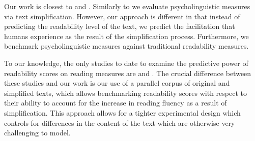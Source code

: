 Our work is closest to \citet{howcroft-demberg2017} and \citet{nahatame2021text}. Similarly to \citet{howcroft-demberg2017} we evaluate  psycholinguistic measures via text simplification. However, our approach is different in that instead of predicting the readability level of the text, we predict the facilitation that humans experience as the result of the simplification process. Furthermore, we benchmark psycholinguistic measures against traditional readability measures. 

To our knowledge, the only studies to date to examine the predictive power of readability scores on reading measures are \citet{nahatame2021text} and \cite{hollenstein-2022-patterns}. The crucial difference between these studies and our work is our use of a parallel corpus of original and simplified texts, which allows benchmarking readability scores with respect to their ability to account for the increase in reading fluency as a result of simplification. This approach allows for a tighter experimental design which controls for differences in the content of the text which are otherwise very challenging to model.
